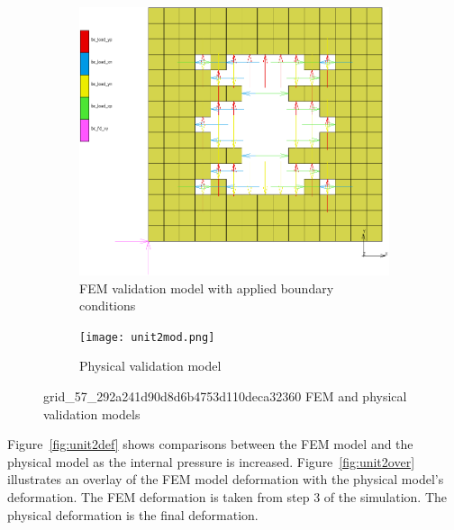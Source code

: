 \begin{figure}[H]
	\centering
	\begin{subfigure}[t]{0.5\textwidth}
		\includegraphics[width=\textwidth]{unit2bc.png}
		\caption{FEM validation model with applied boundary conditions}
		\label{fig:unit2bc}
	\end{subfigure}
	\hfill
	\begin{subfigure}[t]{0.4\textwidth}
		\centering
		\texttt{[image: unit2mod.png]}
		\caption{Physical validation model}
		\label{fig:unit2mod}
	\end{subfigure}
	\caption[FEM and physical models of unit 2]{grid\_57\_292a241d90d8d6b4753d110deca32360 FEM and physical validation models}
	\label{fig:unit2}
\end{figure}

Figure~\ref{fig:unit2def} shows comparisons between the FEM model and the physical model as the internal pressure is increased. Figure~\ref{fig:unit2over} illustrates an overlay of the FEM model deformation with the physical model's deformation. The FEM deformation is taken from step 3 of the simulation. The physical deformation is the final deformation.


